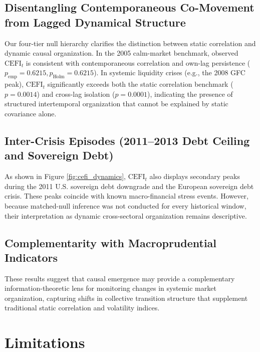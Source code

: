 \documentclass[review,12pt,authoryear]{elsarticle}
\begin{document}
\subsection{Disentangling Contemporaneous Co-Movement from Lagged Dynamical Structure}
Our four-tier null hierarchy clarifies the distinction between static correlation and dynamic causal organization. In the 2005 calm-market benchmark, observed $\mathrm{CEFI}_t$ is consistent with contemporaneous correlation and own-lag persistence ($p_{\text{emp}} = 0.6215, p_{\text{Holm}} = 0.6215$). In systemic liquidity crises (e.g., the 2008 GFC peak), $\mathrm{CEFI}_t$ significantly exceeds both the static correlation benchmark ($p = 0.0014$) and cross-lag isolation ($p = 0.0001$), indicating the presence of structured intertemporal organization that cannot be explained by static covariance alone.

\subsection{Inter-Crisis Episodes (2011--2013 Debt Ceiling and Sovereign Debt)}
As shown in Figure \ref{fig:cefi_dynamics}, $\mathrm{CEFI}_t$ also displays secondary peaks during the 2011 U.S. sovereign debt downgrade and the European sovereign debt crisis. These peaks coincide with known macro-financial stress events. However, because matched-null inference was not conducted for every historical window, their interpretation as dynamic cross-sectoral organization remains descriptive.

\subsection{Complementarity with Macroprudential Indicators}
These results suggest that causal emergence may provide a complementary information-theoretic lens for monitoring changes in systemic market organization, capturing shifts in collective transition structure that supplement traditional static correlation and volatility indices.

\section{Limitations}
\label{sec:limitations}
\end{document}
